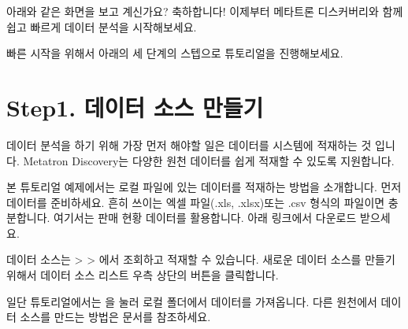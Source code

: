 \documentclass[letterpaper,10pt,english]{sphinxmanual}
\begin{document}
아래와 같은 화면을 보고 계신가요? 축하합니다! 이제부터 메타트론 디스커버리와 함께 쉽고 빠르게 데이터 분석을 시작해보세요.
\begin{quote}

\begin{figure}[H]
\centering

\noindent{}
\end{figure}
\end{quote}

빠른 시작을 위해서 아래의 세 단계의 스텝으로 튜토리얼을 진행해보세요.


\section{Step1. 데이터 소스 만들기}
\label{\detokenize{discovery/part00/step1:step1}}\label{\detokenize{discovery/part00/step1::doc}}
데이터 분석을 하기 위해 가장 먼저 해야할 일은 데이터를 시스템에 적재하는 것 입니다. Metatron Discovery는 다양한 원천 데이터를 쉽게 적재할 수 있도록 지원합니다.

본 튜토리얼 예제에서는 로컬 파일에 있는 데이터를 적재하는 방법을 소개합니다. 먼저 데이터를 준비하세요. 흔히 쓰이는 엑셀 파일(.xls, .xlsx)또는 .csv 형식의 파일이면 충분합니다. 여기서는 판매 현황 데이터를 활용합니다. 아래 링크에서 다운로드 받으세요.
\begin{quote}

\end{quote}

데이터 소스는  \textgreater{}  \textgreater{} 에서 조회하고 적재할 수 있습니다. 새로운 데이터 소스를 만들기 위해서 데이터 소스 리스트 우측 상단의  버튼을 클릭합니다.
\begin{quote}

\begin{figure}[H]
\centering

\noindent{}
\end{figure}
\end{quote}

일단 튜토리얼에서는 을 눌러 로컬 폴더에서 데이터를 가져옵니다. 다른 원천에서 데이터 소스를 만드는 방법은 {\hyperref[\detokenize{discovery/part02/create_a_data_source::doc}]{}} 문서를 참조하세요.
\end{document}
